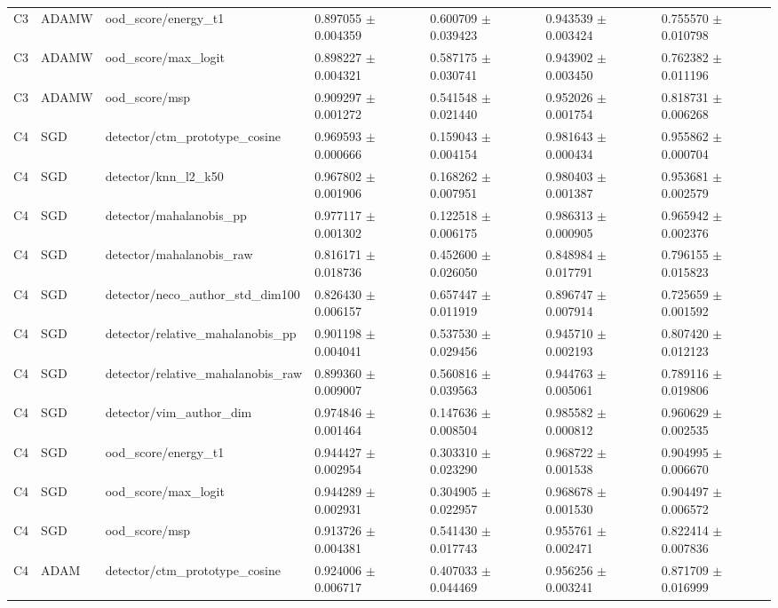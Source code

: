 \begin{longtable}{lllllll}
C3 & ADAMW & ood\_score/energy\_t1 & 0.897055 $\pm$ 0.004359 & 0.600709 $\pm$ 0.039423 & 0.943539 $\pm$ 0.003424 & 0.755570 $\pm$ 0.010798 \\
C3 & ADAMW & ood\_score/max\_logit & 0.898227 $\pm$ 0.004321 & 0.587175 $\pm$ 0.030741 & 0.943902 $\pm$ 0.003450 & 0.762382 $\pm$ 0.011196 \\
C3 & ADAMW & ood\_score/msp & 0.909297 $\pm$ 0.001272 & 0.541548 $\pm$ 0.021440 & 0.952026 $\pm$ 0.001754 & 0.818731 $\pm$ 0.006268 \\
C4 & SGD & detector/ctm\_prototype\_cosine & 0.969593 $\pm$ 0.000666 & 0.159043 $\pm$ 0.004154 & 0.981643 $\pm$ 0.000434 & 0.955862 $\pm$ 0.000704 \\
C4 & SGD & detector/knn\_l2\_k50 & 0.967802 $\pm$ 0.001906 & 0.168262 $\pm$ 0.007951 & 0.980403 $\pm$ 0.001387 & 0.953681 $\pm$ 0.002579 \\
C4 & SGD & detector/mahalanobis\_pp & 0.977117 $\pm$ 0.001302 & 0.122518 $\pm$ 0.006175 & 0.986313 $\pm$ 0.000905 & 0.965942 $\pm$ 0.002376 \\
C4 & SGD & detector/mahalanobis\_raw & 0.816171 $\pm$ 0.018736 & 0.452600 $\pm$ 0.026050 & 0.848984 $\pm$ 0.017791 & 0.796155 $\pm$ 0.015823 \\
C4 & SGD & detector/neco\_author\_std\_dim100 & 0.826430 $\pm$ 0.006157 & 0.657447 $\pm$ 0.011919 & 0.896747 $\pm$ 0.007914 & 0.725659 $\pm$ 0.001592 \\
C4 & SGD & detector/relative\_mahalanobis\_pp & 0.901198 $\pm$ 0.004041 & 0.537530 $\pm$ 0.029456 & 0.945710 $\pm$ 0.002193 & 0.807420 $\pm$ 0.012123 \\
C4 & SGD & detector/relative\_mahalanobis\_raw & 0.899360 $\pm$ 0.009007 & 0.560816 $\pm$ 0.039563 & 0.944763 $\pm$ 0.005061 & 0.789116 $\pm$ 0.019806 \\
C4 & SGD & detector/vim\_author\_dim & 0.974846 $\pm$ 0.001464 & 0.147636 $\pm$ 0.008504 & 0.985582 $\pm$ 0.000812 & 0.960629 $\pm$ 0.002535 \\
C4 & SGD & ood\_score/energy\_t1 & 0.944427 $\pm$ 0.002954 & 0.303310 $\pm$ 0.023290 & 0.968722 $\pm$ 0.001538 & 0.904995 $\pm$ 0.006670 \\
C4 & SGD & ood\_score/max\_logit & 0.944289 $\pm$ 0.002931 & 0.304905 $\pm$ 0.022957 & 0.968678 $\pm$ 0.001530 & 0.904497 $\pm$ 0.006572 \\
C4 & SGD & ood\_score/msp & 0.913726 $\pm$ 0.004381 & 0.541430 $\pm$ 0.017743 & 0.955761 $\pm$ 0.002471 & 0.822414 $\pm$ 0.007836 \\
C4 & ADAM & detector/ctm\_prototype\_cosine & 0.924006 $\pm$ 0.006717 & 0.407033 $\pm$ 0.044469 & 0.956256 $\pm$ 0.003241 & 0.871709 $\pm$ 0.016999 \\

\end{longtable}
